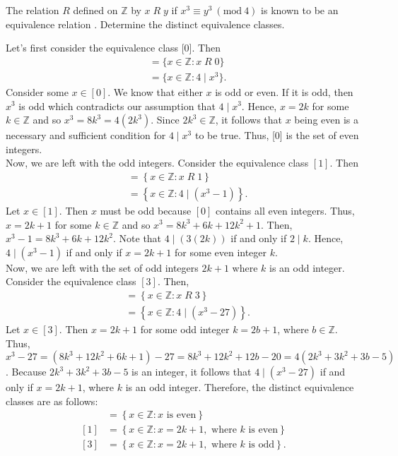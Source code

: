 \documentclass[12pt]{article}
\newcommand{\Z}{\mathbb{Z}}
\newcommand{\Mod}[1]{\ (\mathrm{mod}\ #1)}
\newenvironment{problem}[2][Problem]{\begin{trivlist} \item[\hskip \labelsep {\bfseries #1}\hskip \labelsep {\bfseries #2.}]}{\end{trivlist}}
\newenvironment{solution}[2][Solution]{\begin{trivlist} \item[\hskip \labelsep {\bfseries #1}\hskip \labelsep {\bfseries #2.}]}{\end{trivlist}}
\begin{document}
\begin{problem}{48}
  The relation $R$ defined on $\Z$ by $x \; R \; y$ if $x^{3} \equiv y^{3} \Mod 4$ is known to be an equivalence relation . Determine the distinct equivalence classes.
  \begin{solution}{48}
   Let's first consider the equivalence class [0]. Then
   \begin{align*}
     [0] &= \{x\in \Z:x\; R \;0\}\\
     &= \{x\in \Z:4\mid x^{3}\}.
   \end{align*}
   Consider some $x\in [0]$. We know that either $x$ is odd or even. If it is odd, then $x^{3}$ is odd which contradicts our assumption that $4\mid x^{3}$. Hence, $x=2k$ for some $k\in \Z$ and so $x^{3} = 8k^{3} = 4\left( 2k^{3} \right)$. Since $2k^{3} \in \Z$, it follows that $x$ being even is a necessary and sufficient condition for $4\mid x^{3}$ to be true. Thus, [0] is the set of even integers.\\

   Now, we are left with the odd integers. Consider the equivalence class $[1]$. Then
   \begin{align*}
     [1] &= \left\{x\in \Z: x \; R \; 1 \right\}\\
     &= \left\{ x\in\Z: 4\mid\left(x^{3}-1 \right) \right\}.
   \end{align*}
   Let $x\in[1]$. Then $x$ must be odd because $[0]$ contains all even integers. Thus, $x=2k+1$ for some $k\in\Z$ and so $x^{3} = 8k^{3} + 6k + 12k^{2} + 1$. Then, $x^{3} -1 = 8k^{3} + 6k + 12k^{2}$. Note that $4\mid (3(2k))$ if and only if $2\mid k$. Hence, $4\mid \left( x^{3} -1 \right)$ if and only if $x=2k+1$ for some even integer $k$. \\

   Now, we are left with the set of odd integers $2k+1$ where $k$ is an odd integer. Consider the equivalence class $[3]$. Then,
   \begin{align*}
     [3] &= \left\{x\in \Z: x \; R \; 3 \right\}\\
     &= \left\{ x\in\Z: 4\mid\left(x^{3}-27 \right) \right\}.
   \end{align*}
   Let $x\in[3]$. Then $x=2k+1$ for some odd integer $k=2b+1$, where $b\in\Z$. Thus, $x^{3}-27= (8k^{3}+12k^{2}+6k+1)-27 = 8k^{3}+12k^{2}+12b-20 = 4(2k^{3}+3k^{2}+3b-5)$. Because $2k^{3}+3k^{2}+3b-5$ is an integer, it follows that $4\mid\left(x^{3}-27 \right)$ if and only if $x=2k+1$, where $k$ is an odd integer. Therefore, the distinct equivalence classes are as follows:
   \begin{align*}
     [0] &= \left\{ x\in \Z: x \text{ is even}\right\}\\
     [1] &= \left\{ x\in \Z: x=2k+1, \text{ where }k\text{ is even} \right\}\\
     [3] &= \left\{ x\in\Z: x=2k+1, \text{ where }k\text{ is odd} \right\}.
   \end{align*}
  \end{solution}
\end{problem}
\end{document}
